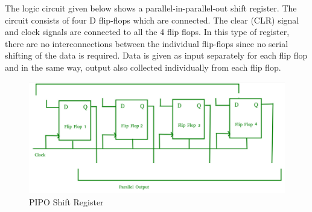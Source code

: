 \documentclass[12pt]{article}
\begin{document}
\noindent The logic circuit given below shows a parallel-in-parallel-out shift register. The circuit consists of four D flip-flops which are connected. The clear (CLR) signal and clock signals are connected to all the 4 flip flops. In this type of register, there are no interconnections between the individual flip-flops since no serial shifting of the data is required. Data is given as input separately for each flip flop and in the same way, output also collected individually from each flip flop.
\begin{figure}[H]
    \centering
    \includegraphics[scale=0.5]{circuit diagram/PIPO.png}
    \caption{PIPO Shift Register}
\end{figure}
\end{document}
